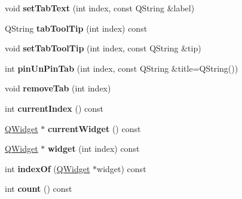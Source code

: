 \begin{DoxyCompactItemize}
\item 
\hypertarget{class_tab_stacked_widget_a9eb31d54313fadd7240438f98206343f}{
void {\bfseries setTabText} (int index, const QString \&label)}
\label{class_tab_stacked_widget_a9eb31d54313fadd7240438f98206343f}

\item 
\hypertarget{class_tab_stacked_widget_a38c74726adf08931c0035f5232d993b2}{
QString {\bfseries tabToolTip} (int index) const }
\label{class_tab_stacked_widget_a38c74726adf08931c0035f5232d993b2}

\item 
\hypertarget{class_tab_stacked_widget_a695722b14055d2cf2db50cc1ac44796c}{
void {\bfseries setTabToolTip} (int index, const QString \&tip)}
\label{class_tab_stacked_widget_a695722b14055d2cf2db50cc1ac44796c}

\item 
\hypertarget{class_tab_stacked_widget_a189fe7535ae814fdf43ba1abff94678c}{
int {\bfseries pinUnPinTab} (int index, const QString \&title=QString())}
\label{class_tab_stacked_widget_a189fe7535ae814fdf43ba1abff94678c}

\item 
\hypertarget{class_tab_stacked_widget_a3c2ace9ea78144c9fbbce3bf0a299e89}{
void {\bfseries removeTab} (int index)}
\label{class_tab_stacked_widget_a3c2ace9ea78144c9fbbce3bf0a299e89}

\item 
\hypertarget{class_tab_stacked_widget_ab9b45fb1c0872f2f674a8f1d4c00c945}{
int {\bfseries currentIndex} () const }
\label{class_tab_stacked_widget_ab9b45fb1c0872f2f674a8f1d4c00c945}

\item 
\hypertarget{class_tab_stacked_widget_ab630369d144ed5bf9df432dba8a49e3d}{
\hyperlink{class_q_widget}{QWidget} $\ast$ {\bfseries currentWidget} () const }
\label{class_tab_stacked_widget_ab630369d144ed5bf9df432dba8a49e3d}

\item 
\hypertarget{class_tab_stacked_widget_ae178d95c603dec72c09f49ed2ed39761}{
\hyperlink{class_q_widget}{QWidget} $\ast$ {\bfseries widget} (int index) const }
\label{class_tab_stacked_widget_ae178d95c603dec72c09f49ed2ed39761}

\item 
\hypertarget{class_tab_stacked_widget_ae67cadc2b20fbfd520305ba57d3d1f32}{
int {\bfseries indexOf} (\hyperlink{class_q_widget}{QWidget} $\ast$widget) const }
\label{class_tab_stacked_widget_ae67cadc2b20fbfd520305ba57d3d1f32}

\item 
\hypertarget{class_tab_stacked_widget_a235c2b586a7f8ab231acf2e0472ce3ae}{
int {\bfseries count} () const }
\label{class_tab_stacked_widget_a235c2b586a7f8ab231acf2e0472ce3ae}

\end{DoxyCompactItemize}
